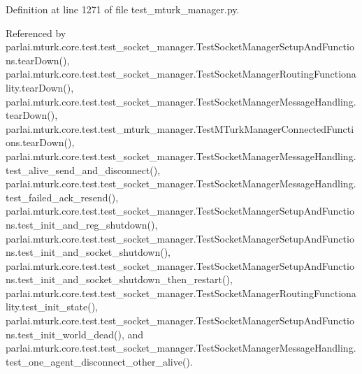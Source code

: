 Definition at line 1271 of file test\+\_\+mturk\+\_\+manager.\+py.



Referenced by parlai.\+mturk.\+core.\+test.\+test\+\_\+socket\+\_\+manager.\+Test\+Socket\+Manager\+Setup\+And\+Functions.\+tear\+Down(), parlai.\+mturk.\+core.\+test.\+test\+\_\+socket\+\_\+manager.\+Test\+Socket\+Manager\+Routing\+Functionality.\+tear\+Down(), parlai.\+mturk.\+core.\+test.\+test\+\_\+socket\+\_\+manager.\+Test\+Socket\+Manager\+Message\+Handling.\+tear\+Down(), parlai.\+mturk.\+core.\+test.\+test\+\_\+mturk\+\_\+manager.\+Test\+M\+Turk\+Manager\+Connected\+Functions.\+tear\+Down(), parlai.\+mturk.\+core.\+test.\+test\+\_\+socket\+\_\+manager.\+Test\+Socket\+Manager\+Message\+Handling.\+test\+\_\+alive\+\_\+send\+\_\+and\+\_\+disconnect(), parlai.\+mturk.\+core.\+test.\+test\+\_\+socket\+\_\+manager.\+Test\+Socket\+Manager\+Message\+Handling.\+test\+\_\+failed\+\_\+ack\+\_\+resend(), parlai.\+mturk.\+core.\+test.\+test\+\_\+socket\+\_\+manager.\+Test\+Socket\+Manager\+Setup\+And\+Functions.\+test\+\_\+init\+\_\+and\+\_\+reg\+\_\+shutdown(), parlai.\+mturk.\+core.\+test.\+test\+\_\+socket\+\_\+manager.\+Test\+Socket\+Manager\+Setup\+And\+Functions.\+test\+\_\+init\+\_\+and\+\_\+socket\+\_\+shutdown(), parlai.\+mturk.\+core.\+test.\+test\+\_\+socket\+\_\+manager.\+Test\+Socket\+Manager\+Setup\+And\+Functions.\+test\+\_\+init\+\_\+and\+\_\+socket\+\_\+shutdown\+\_\+then\+\_\+restart(), parlai.\+mturk.\+core.\+test.\+test\+\_\+socket\+\_\+manager.\+Test\+Socket\+Manager\+Routing\+Functionality.\+test\+\_\+init\+\_\+state(), parlai.\+mturk.\+core.\+test.\+test\+\_\+socket\+\_\+manager.\+Test\+Socket\+Manager\+Setup\+And\+Functions.\+test\+\_\+init\+\_\+world\+\_\+dead(), and parlai.\+mturk.\+core.\+test.\+test\+\_\+socket\+\_\+manager.\+Test\+Socket\+Manager\+Message\+Handling.\+test\+\_\+one\+\_\+agent\+\_\+disconnect\+\_\+other\+\_\+alive().

\mbox{\label{classparlai_1_1mturk_1_1core_1_1test_1_1test__mturk__manager_1_1TestMTurkManagerConnectedFunctions_a2f9acd81ce0c81968cad27572cf6d204}} 
